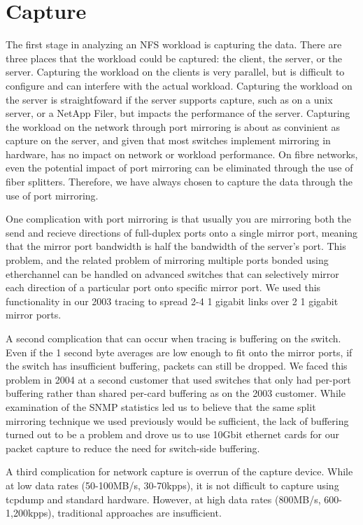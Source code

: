 \section{Capture}

The first stage in analyzing an NFS workload is capturing the data.
There are three places that the workload could be captured: the
client, the server, or the server.  Capturing the workload on the
clients is very parallel, but is difficult to configure and can
interfere with the actual workload.  Capturing the workload on the
server is straightfoward if the server supports capture, such as on a
unix server, or a NetApp Filer, but impacts the performance of the
server.  Capturing the workload on the network through port mirroring
is about as convinient as capture on the server, and given that most
switches implement mirroring in hardware, has no impact on network or
workload performance.  On fibre networks, even the potential impact of
port mirroring can be eliminated through the use of fiber
splitters\cite{...}. Therefore, we have always chosen to capture the
data through the use of port mirroring.

One complication with port mirroring is that usually you are mirroring
both the send and recieve directions of full-duplex ports onto a
single mirror port, meaning that the mirror port bandwidth is half the
bandwidth of the server's port.  This problem, and the related problem
of mirroring multiple ports bonded using etherchannel can be handled
on advanced switches that can selectively mirror each direction of a
particular port onto specific mirror port.  We used this functionality
in our 2003 tracing to spread 2-4 1 gigabit links over 2 1 gigabit
mirror ports.

A second complication that can occur when tracing is buffering on the
switch.  Even if the 1 second byte averages are low enough to fit onto
the mirror ports, if the switch has insufficient buffering, packets
can still be dropped.  We faced this problem in 2004 at a second
customer that used switches that only had per-port buffering rather
than shared per-card buffering as on the 2003 customer.  While
examination of the SNMP statistics led us to believe that the same
split mirroring technique we used previously would be sufficient, the
lack of buffering turned out to be a problem and drove us to use
10Gbit ethernet cards for our packet capture to reduce the need for
switch-side buffering.

A third complication for network capture is overrun of the capture
device.  While at low data rates (50-100MB/s, 30-70kpps), it is not
difficult to capture using tcpdump and standard hardware.  However, at
high data rates (800MB/s, 600-1,200kpps), traditional approaches are
insufficient.

